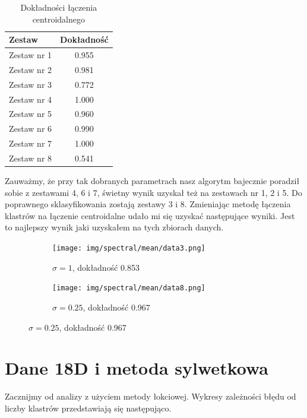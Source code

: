\documentclass[polish,12pt,a4paper]{extarticle}
\begin{document}
\begin{table}[h!]
\centering
\begin{tabular}{|l|c|}
\hline
\textbf{Zestaw} & \textbf{Dokładność} \\
\hline
Zestaw nr 1 & 0.955 \\
Zestaw nr 2 & 0.981 \\
Zestaw nr 3 & 0.772 \\
Zestaw nr 4 & 1.000 \\
Zestaw nr 5 & 0.960 \\
Zestaw nr 6 & 0.990 \\
Zestaw nr 7 & 1.000 \\
Zestaw nr 8 & 0.541 \\
\hline
\end{tabular}
\caption{Dokładności łączenia centroidalnego}
\end{table}

\noindent Zauważmy, że przy tak dobranych parametrach nasz algorytm bajecznie poradził sobie z zestawami 4, 6 i 7, świetny wynik uzyskał też na zestawach nr 1, 2 i 5. Do poprawnego sklasyfikowania zostają zestawy 3 i 8. Zmieniając metodę łączenia klastrów na łączenie centroidalne udało mi się uzyskać następujące wyniki. Jest to najlepszy wynik jaki uzyskałem na tych zbiorach danych.

\begin{figure}[h!]
    \centering
    \begin{subfigure}[b]{0.30\textwidth}
        \texttt{[image: img/spectral/mean/data3.png]}
        \captionsetup{labelformat=empty}
        \caption{$\sigma = 1$, dokładność 0.853}
    \end{subfigure}
    \hspace{}
    \begin{subfigure}[b]{0.30\textwidth}
        \texttt{[image: img/spectral/mean/data8.png]}
        \captionsetup{labelformat=empty}
        \caption{$\sigma = 0.25$, dokładność 0.967}
    \end{subfigure}

    \label{fig:data_grid}
\end{figure} \FloatBarrier

\section{Dane 18D i metoda sylwetkowa}
Zacznijmy od analizy z użyciem metody łokciowej. Wykresy zależności błędu od liczby klastrów przedstawiają się następująco.
\end{document}
